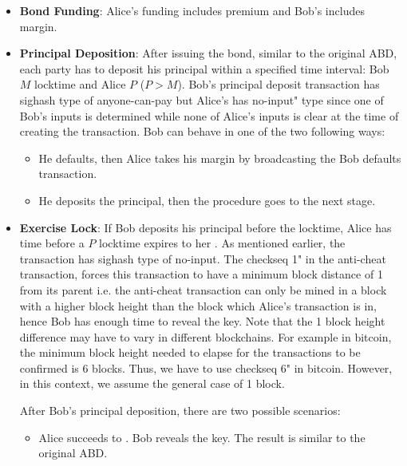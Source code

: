 \begin{itemize}
    \item \textbf{Bond Funding}: Alice's funding includes premium and Bob's includes margin.   
    
    \item \textbf{Principal Deposition}: 
        After issuing the bond, similar to the original ABD, each party has to deposit his principal within a specified time interval: Bob $M$ locktime and Alice $P$ ($P > M$). Bob's principal deposit transaction has sighash type of anyone-can-pay but Alice's  has no-input" type since one of Bob's inputs is determined while none of Alice's inputs is clear at the time of creating the transaction. Bob can behave in one of the two following ways:
    \begin{itemize}
        \item He defaults, then Alice takes his margin by broadcasting the Bob defaults transaction.
        \item He deposits the principal, then the procedure goes to the next stage.
    \end{itemize}
    
    \item \textbf{Exercise Lock}: If Bob deposits his principal before the locktime, Alice has time before a $P$ locktime expires to  her . As mentioned earlier, the  transaction has sighash type of no-input. The checkseq 1" in the anti-cheat transaction, forces this transaction to have a minimum block distance of 1 from its parent i.e. the anti-cheat transaction can only be mined in a block with a higher block height than the block which Alice's  transaction is in, hence Bob has enough time to reveal the \keyone key. Note that the 1 block height difference may have to vary in different blockchains. For example in bitcoin, the minimum block height needed to elapse for the transactions to be confirmed is 6 blocks. Thus, we have to use checkseq 6" in bitcoin. However, in this context, we assume the general case of 1 block.
    
    After Bob's principal deposition, there are two possible scenarios: 
    \begin{itemize}
        \item Alice succeeds to . Bob reveals the \keyone key. The result is similar to the original ABD. 
        

\end{itemize}
\end{itemize}
